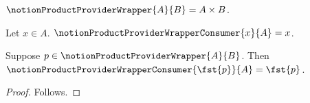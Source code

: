 

\begin{definition}\label{notion_product_provider_wrapper}
    $\notionProductProviderWrapper{A}{B}=A\times B$.
\end{definition}

\begin{definition}\label{notion_product_provider_wrapper_consumer}
    Let $x\in A$.
    $\notionProductProviderWrapperConsumer{x}{A}=x$.
\end{definition}

\begin{proposition}\label{notion_product_provider_wrapper_rejected}
    Suppose $p\in\notionProductProviderWrapper{A}{B}$.
    Then $\notionProductProviderWrapperConsumer{\fst{p}}{A}=\fst{p}$.
\end{proposition}
\begin{proof}
    Follows.
\end{proof}
